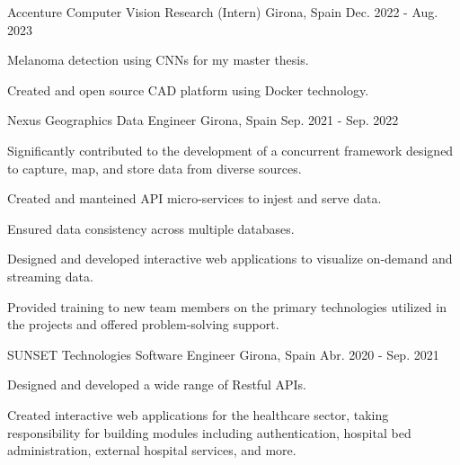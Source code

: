 \begin{cventries}
    \cventry
    {Accenture} %
    {Computer Vision Research (Intern)} %
    {Girona, Spain} %
    {Dec. 2022 - Aug. 2023} %
    {
    \begin{cvitems}
    \item{Melanoma detection using CNNs for my master thesis.}
    \item{Created and open source CAD platform using Docker technology.}
    \end{cvitems}
    }

      \cventry
      {Nexus Geographics} %
      {Data Engineer} %
      {Girona, Spain} %
      {Sep. 2021 - Sep. 2022} %
      {
        \begin{cvitems}
        \item {Significantly contributed to the development of a concurrent
          framework designed to capture, map, and store data from diverse
        sources.}
        \item {Created and manteined API micro-services to injest and serve data.}
        \item {Ensured data consistency across multiple databases.}
        \item {Designed and developed interactive web applications to visualize
          on-demand and streaming data.}
        \item {Provided training to new team members on the primary
          technologies utilized in the projects and offered problem-solving
        support.}
        \end{cvitems}
      }


      \cventry
      {SUNSET Technologies} %
      {Software Engineer} %
      {Girona, Spain} %
      {Abr. 2020 - Sep. 2021} %
      {
        \begin{cvitems}
        \item {Designed and developed a wide range of Restful APIs.}
        \item {Created interactive web applications for the healthcare sector,
          taking responsibility for building modules including authentication,
        hospital bed administration, external hospital services, and more.}
        \end{cvitems}
      }

  \end{cventries}

